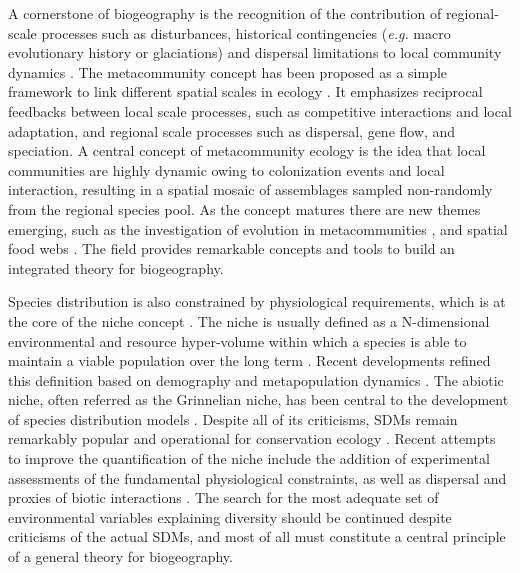 A cornerstone of biogeography is the recognition of the contribution of regional-scale processes such as disturbances, historical contingencies (\textit{e.g.} macro evolutionary history or glaciations) and dispersal limitations to local community dynamics \citep{Ricklefs1987}. The metacommunity concept has been proposed as a simple framework to link different spatial scales in ecology \citep{Leibold2004}. It emphasizes reciprocal feedbacks between local scale processes, such as competitive interactions and local adaptation, and regional scale processes such as dispersal, gene flow, and speciation. A central concept of metacommunity ecology is the idea that local communities are highly dynamic owing to colonization events and local interaction, resulting in a spatial mosaic of assemblages sampled non-randomly from the regional species pool. As the concept matures there are new themes emerging, such as the investigation of evolution in metacommunities \citep{Urban2008}, and spatial food webs \citep{Massol2011,Gravel2011}. The field provides remarkable concepts and tools to build an integrated theory for biogeography.

Species distribution is also constrained by physiological requirements, which is at the core of the niche concept \citep{Peterson2011}. The niche is usually defined as a N-dimensional environmental and resource hyper-volume within which a species is able to maintain a viable population over the long term \citep{Chase2003}. Recent developments refined this definition based on demography and metapopulation dynamics \citep{Holt2009}. The abiotic niche, often referred as the Grinnelian niche, has been central to the development of species distribution models \citep[SDMs,][]{Jeschke2008}. Despite all of its criticisms, SDMs remain remarkably popular and operational for conservation ecology \citep{Guisan2013}. Recent attempts to improve the quantification of the niche include the addition of experimental assessments of the fundamental physiological constraints, as well as dispersal and proxies of biotic interactions \citep{Boulangeat2012}. The search for the most adequate set of environmental variables explaining diversity should be continued despite criticisms of the actual SDMs, and most of all must constitute a central principle of a general theory for biogeography.

